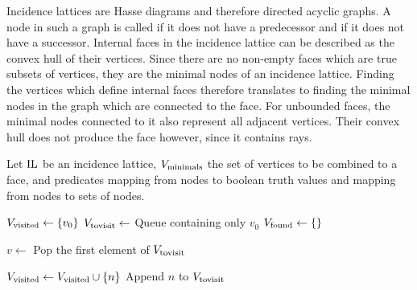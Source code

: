 Incidence lattices are Hasse diagrams and therefore directed acyclic graphs.
A node in such a graph is called  if it does not have a predecessor and  if it does not have a successor.
Internal faces in the incidence lattice can be described as the convex hull of their vertices.
Since there are no non-empty faces which are true subsets of vertices, they are the minimal nodes of an incidence lattice.
Finding the vertices which define internal faces therefore translates to finding the minimal nodes in the graph which are connected to the face.
For unbounded faces, the minimal nodes connected to it also represent all adjacent vertices.
Their convex hull does not produce the face however, since it contains rays.

\begin{algorithm}[tbp]
    Let $\operatorname{IL}$ be an incidence lattice, $V_{\textnormal{minimals}}$ the set of vertices to be combined to a face,  and  predicates mapping from nodes to boolean truth values and  mapping from nodes to sets of nodes.
    \begin{algorithmic}[1]
            \State $V_{\textnormal{visited}} \gets \left\{ v_0 \right\}$
            \State $V_{\textnormal{tovisit}} \gets$ Queue containing only $v_0$
            \State $V_{\textnormal{found}} \gets \left\{  \right\}$

                \State $v \gets$ Pop the first element of $V_{\textnormal{tovisit}}$

                            \State $V_{\textnormal{visited}} \gets V_{\textnormal{visited}} \cup \left\{ n \right\}$
                            \State Append $n$ to $V_{\textnormal{tovisit}}$
                        \EndIf
                    \EndFor
                \EndIf


\end{algorithmic}
\end{algorithm}
